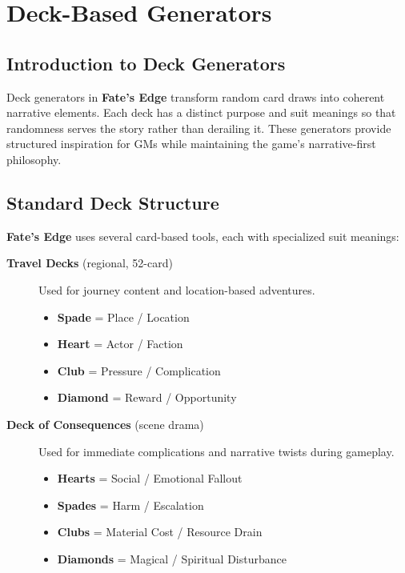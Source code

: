 
\chapter{Deck-Based Generators}\label{chap:deck_generators}

\section{Introduction to Deck Generators}\label{sec:deck_intro}

Deck generators in \textbf{Fate's Edge} transform random card draws into coherent narrative elements. Each deck has a distinct purpose and suit meanings so that randomness serves the story rather than derailing it. These generators provide structured inspiration for GMs while maintaining the game's narrative-first philosophy.

\section{Standard Deck Structure}\label{sec:deck_structure}

\textbf{Fate's Edge} uses several card-based tools, each with specialized suit meanings:

\begin{description}
    \item[\textbf{Travel Decks} (regional, 52-card)] 
        Used for journey content and location-based adventures.
        \begin{itemize}
            \item \textbf{Spade} = Place / Location
            \item \textbf{Heart} = Actor / Faction
            \item \textbf{Club} = Pressure / Complication
            \item \textbf{Diamond} = Reward / Opportunity
        \end{itemize}
    \item[\textbf{Deck of Consequences} (scene drama)] 
        Used for immediate complications and narrative twists during gameplay.
        \begin{itemize}
            \item \textbf{Hearts} = Social / Emotional Fallout
            \item \textbf{Spades} = Harm / Escalation
            \item \textbf{Clubs} = Material Cost / Resource Drain
            \item \textbf{Diamonds} = Magical / Spiritual Disturbance
        \end{itemize}
\end{description}

